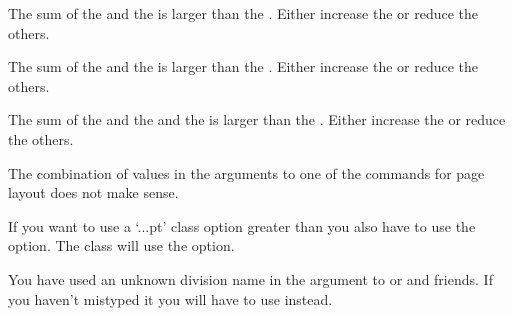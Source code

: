 \begin{plainlist}
        The sum of the \lnc{\paperheight} and the \lnc{\trimtop} is
  larger than the \lnc{\stockheight}. Either increase the \lnc{\stockheight}
  or reduce the others.

\item[]

        The sum of the \lnc{\paperwidth} and the \lnc{\trimedge} is
  larger than the \lnc{\stockwidth}. Either increase the \lnc{\stockwidth}
  or reduce the others.

\item[]

        The sum of the \lnc{\spinemargin} and the \lnc{\textwidth}
  and the \lnc{\foremargin} is
  larger than the \lnc{\paperwidth}. Either increase the \lnc{\paperwidth}
  or reduce the others.


\item[] 

    The combination of values in the arguments to one of the commands
for page layout does not make sense.

\item[]

    If you want to use a `...pt' class option greater than \Lopt{25pt}
you also have to use the  option. The class will
use the \Lopt{17pt} option.


\item[]

    You have used an unknown division name in the argument to 
\cmd{\settocdepth} or \cmd{\setsecnumdepth} and friends. If you haven't
mistyped it you will have to use \cmd{\setcounter} instead.


\end{plainlist}
